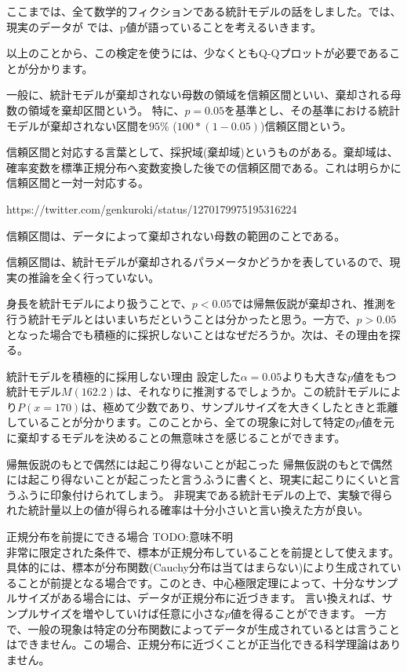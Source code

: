 ここまでは、全て数学的フィクションである統計モデルの話をしました。では、現実のデータが
では、p値が語っていることを考えるいきます。


以上のことから、この検定を使うには、少なくともQ-Qプロットが必要であることが分かります。


一般に、統計モデルが棄却されない母数の領域を信頼区間といい、棄却される母数の領域を棄却区間という。
特に、$p=0.05$を基準とし、その基準における統計モデルが棄却されない区間を$95\%$ ($100*(1-0.05)$)信頼区間という。


信頼区間と対応する言葉として、採択域(棄却域)というものがある。棄却域は、確率変数を標準正規分布へ変数変換した後での信頼区間である。これは明らかに信頼区間と一対一対応する。

https://twitter.com/genkuroki/status/1270179975195316224


信頼区間は、データによって棄却されない母数の範囲のことである。

信頼区間は、統計モデルが棄却されるパラメータかどうかを表しているので、現実の推論を全く行っていない。

身長を統計モデルにより扱うことで、$p<0.05$では帰無仮説が棄却され、推測を行う統計モデルとはいまいちだということは分かったと思う。一方で、$p>0.05$となった場合でも積極的に採択しないことはなぜだろうか。次は、その理由を探る。
\fi

\begin{SMbox}{統計モデルを積極的に採用しない理由}
設定した$\alpha=0.05$よりも大きな$p$値をもつ統計モデル$M(162.2)$は、それなりに推測するでしょうか。この統計モデルにより$P(x=170)$は、極めて少数であり、サンプルサイズを大きくしたときと乖離していることが分かります。このことから、全ての現象に対して特定の$p$値を元に棄却するモデルを決めることの無意味さを感じることができます。
\end{SMbox}
\fi


\begin{SMbox}{帰無仮説のもとで偶然には起こり得ないことが起こった}
    帰無仮説のもとで偶然には起こり得ないことが起こったと言うふうに書くと、現実に起こりにくいと言うふうに印象付けられてしまう。
    非現実である統計モデルの上で、実験で得られた統計量以上の値が得られる確率は十分小さいと言い換えた方が良い。
\end{SMbox}
\fi


\begin{SMbox}{正規分布を前提にできる場合}
TODO:意味不明\\
非常に限定された条件で、標本が正規分布していることを前提として使えます。具体的には、標本が分布関数(Cauchy分布は当てはまらない)により生成されていることが前提となる場合です。このとき、中心極限定理によって、十分なサンプルサイズがある場合には、データが正規分布に近づきます。
言い換えれば、サンプルサイズを増やしていけば任意に小さな$p$値を得ることができます。
一方で、一般の現象は特定の分布関数によってデータが生成されているとは言うことはできません。この場合、正規分布に近づくことが正当化できる科学理論はありません。     
\end{SMbox}
\fi


